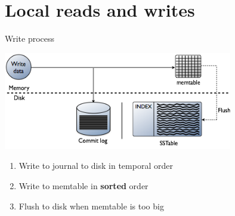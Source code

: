 \documentclass[
  10pt
]{beamer}
\begin{document}
\section{Local reads and writes}  %
\begin{frame}{Write process \cite{datastaxWriteData}}
  \begin{center}
    \includegraphics[width=0.75\textwidth]{resources/local_write.png}
    \begin{enumerate}
      \item<1-> Write to journal to disk in temporal order
      \item<2-> Write to memtable in \textbf{sorted} order
      \item<3-> Flush to disk when memtable is too big
    \end{enumerate}
  \end{center}
\end{frame}
\end{document}

